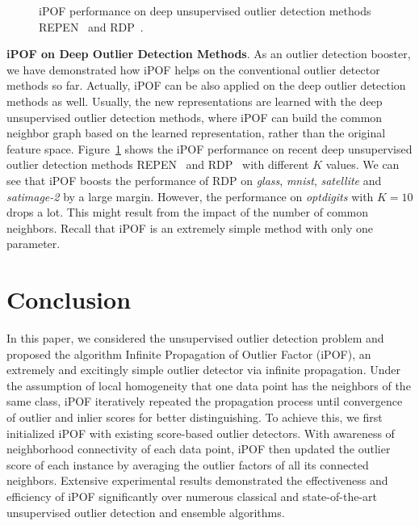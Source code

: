 \documentclass[sigconf,nonacm]{acmart}
\begin{document}
\vspace{-0mm}

\begin{figure}[t]
  \centering
  \caption{iPOF performance on deep unsupervised outlier detection methods REPEN~\cite{pang2018learning} and RDP~\cite{wang2019unsupervised}.} \vspace{-4mm}\label{fig:deep}
\end{figure}

\noindent\textbf{iPOF on Deep Outlier Detection Methods}. As an outlier detection booster, we have demonstrated how iPOF helps on the conventional outlier detector methods so far. Actually, iPOF can be also applied on the deep outlier detection methods as well. Usually, the new representations are learned with the deep unsupervised outlier detection methods, where iPOF can build the common neighbor graph based on the learned representation, rather than the original feature space. Figure~\ref{fig:deep} shows the iPOF performance on recent deep unsupervised outlier detection methods REPEN~\cite{pang2018learning} and RDP~\cite{wang2019unsupervised} with different $K$ values. We can see that iPOF boosts the performance of RDP on \textit{glass}, \textit{mnist}, \textit{satellite} and \textit{satimage-2} by a large margin. However, the performance on \textit{optdigits} with $K=10$ drops a lot. This might result from the impact of the number of common neighbors. Recall that iPOF is an extremely simple method with only one parameter. 

\section{Conclusion}\label{sec:conclusion}
In this paper, we considered the unsupervised outlier detection problem and proposed the algorithm Infinite Propagation of Outlier Factor (iPOF), an extremely and excitingly simple outlier detector via infinite propagation. Under the assumption of local homogeneity that one data point has the neighbors of the same class, iPOF iteratively repeated the propagation process until convergence of outlier and inlier scores for better distinguishing. To achieve this, we first initialized iPOF with existing score-based outlier detectors. With awareness of neighborhood connectivity of each data point, iPOF then updated the outlier score of each instance by averaging the outlier factors of all its connected neighbors. Extensive experimental results demonstrated the effectiveness and efficiency of iPOF significantly over numerous classical and state-of-the-art unsupervised outlier detection and ensemble algorithms. 




\end{document}
